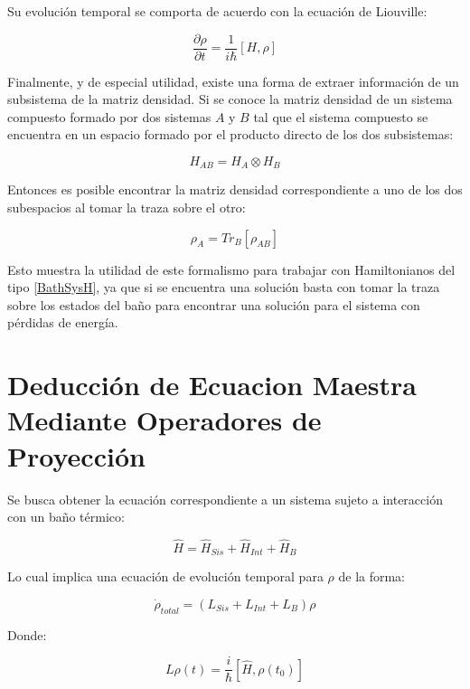 \documentclass[a4paper,10pt]{report}
\begin{document}
Su evolución temporal se comporta de acuerdo con la ecuación de Liouville:

\begin{equation}
\dfrac{\partial \rho}{\partial t} = \frac{1}{i\hbar}[H,\rho]
\end{equation}

Finalmente, y de especial utilidad, existe una forma de extraer información de un subsistema de la matriz densidad. Si se conoce la matriz densidad de un sistema compuesto formado por dos sistemas $A$ y $B$ tal que el sistema compuesto se encuentra en un espacio formado por el producto directo de los dos subsistemas:

\begin{equation}
H_{AB} = H_A \otimes H_B
\end{equation}

Entonces es posible encontrar la matriz densidad correspondiente a uno de los dos subespacios al tomar la traza sobre el otro:

\begin{equation}
\rho_A = Tr_B [\rho_{AB}]
\end{equation}

Esto muestra la utilidad de este formalismo para trabajar con Hamiltonianos del tipo \ref{BathSysH}, ya que si se encuentra una solución basta con tomar la traza sobre los estados del baño para encontrar una solución para el sistema con pérdidas de energía.

\section{Deducción de Ecuacion Maestra Mediante Operadores de Proyección}

Se busca obtener la ecuación correspondiente a un sistema sujeto a interacción con un baño térmico:

\begin{equation}
\hat{H} = \hat{H}_{Sis}+\hat{H}_{Int}+\hat{H}_B
\end{equation}

Lo cual implica una ecuación de evolución temporal para $\rho$ de la forma:

\begin{equation}\label{LMeq}
\dot{\rho}_{total} = (L_{Sis}+L_{Int}+L_B)\rho
\end{equation}

Donde:

\begin{equation}\label{defL}
L\rho(t) = \frac{i}{\hbar}[\hat{H},\rho(t_0)]
\end{equation}
\end{document}
